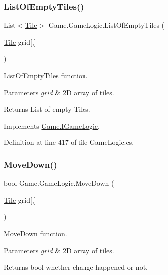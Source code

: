 \subsubsection{\texorpdfstring{ListOfEmptyTiles()}{ListOfEmptyTiles()}}
{\footnotesize\ttfamily List$<$\mbox{\hyperlink{class_game_1_1_tile}{Tile}}$>$ Game.\+Game\+Logic.\+List\+Of\+Empty\+Tiles (\begin{DoxyParamCaption}\item[{\mbox{\hyperlink{class_game_1_1_tile}{Tile}}}]{grid\mbox{[},\mbox{]} }\end{DoxyParamCaption})}



List\+Of\+Empty\+Tiles function. 


\begin{DoxyParams}{Parameters}
{\em grid} & 2D array of tiles.\\
\hline
\end{DoxyParams}
\begin{DoxyReturn}{Returns}
List of empty Tiles.
\end{DoxyReturn}


Implements \mbox{\hyperlink{interface_game_1_1_i_game_logic_a9453d57d56d6af99aaa89d2b946430f3}{Game.\+I\+Game\+Logic}}.



Definition at line 417 of file Game\+Logic.\+cs.

\mbox{\label{class_game_1_1_game_logic_ae7032504eaee895fdce17c64490c0a52}} 
\subsubsection{\texorpdfstring{MoveDown()}{MoveDown()}}
{\footnotesize\ttfamily bool Game.\+Game\+Logic.\+Move\+Down (\begin{DoxyParamCaption}\item[{\mbox{\hyperlink{class_game_1_1_tile}{Tile}}}]{grid\mbox{[},\mbox{]} }\end{DoxyParamCaption})}



Move\+Down function. 


\begin{DoxyParams}{Parameters}
{\em grid} & 2D array of tiles.\\
\hline
\end{DoxyParams}
\begin{DoxyReturn}{Returns}
bool whether change happened or not.
\end{DoxyReturn}


